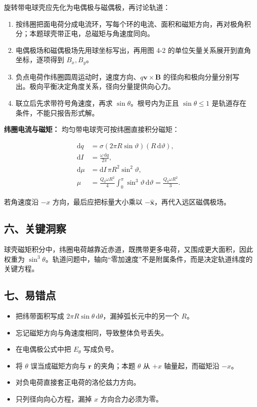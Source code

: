 \documentclass[12pt,a4paper,UTF8]{ctexart}
\newcommand{\tightlist}{\setlength{\itemsep}{0pt}\setlength{\parskip}{0pt}}
\begin{document}
旋转带电球壳应先化为电偶极与磁偶极，再讨论轨道：

\begin{enumerate}
\def\labelenumi{\arabic{enumi}.}
\tightlist
\item
  按纬圈把面电荷分成电流环，写每个环的电流、面积和磁矩方向，再对极角积分；本题球壳带正电，总磁矩与角速度同向。
\item
  电偶极场和磁偶极场先用球坐标写出，再用图 4-2
  的单位矢量关系展开到直角坐标，逐项得到 \(B_x,B_y\)。
\item
  负点电荷作纬圈圆周运动时，速度方向、\(q\boldsymbol v\times\boldsymbol B\)
  的径向和极向分量分别写出。极向平衡决定角度关系，径向分量提供向心力。
\item
  联立后先求带符号角速度，再求 \(\sin\theta\)。根号内为正且
  \(\sin\theta\le1\) 是轨道存在条件，不能只报告形式解。
\end{enumerate}

\textbf{纬圈电流与磁矩：} 均匀带电球壳可按纬圈直接积分磁矩：

\[\begin{aligned}
\mathrm dq&=\sigma(2\pi R\sin\vartheta)
(R\,\mathrm d\vartheta),\\
\mathrm dI&=\frac{\omega\,\mathrm dq}{2\pi},\\
\mathrm d\mu&=\mathrm dI\,\pi R^2\sin^2\vartheta,\\
\mu&=\frac{Q_0\omega R^2}{4}
\int_0^\pi\sin^3\vartheta\,\mathrm d\vartheta
=\frac{Q_0\omega R^2}{3}.
\end{aligned}\]

若角速度沿 \(-x\) 方向，最后应把标量大小乘以
\(-\hat{\boldsymbol x}\)，再代入远区磁偶极场。

\subsection{六、关键洞察}\label{ux516dux5173ux952eux6d1eux5bdf-3}

球壳磁矩积分中，纬圈电荷越靠近赤道，既携带更多电荷，又围成更大面积，因此权重为
\(\sin^3\theta\)。轨道问题中，轴向``零加速度''不是附属条件，而是决定轨道纬度的关键方程。

\subsection{七、易错点}\label{ux4e03ux6613ux9519ux70b9-3}

\begin{itemize}
\tightlist
\item
  把纬带面积写成
  \(2\pi R\sin\theta\,\mathrm d\theta\)，漏掉弧长元中的另一个 \(R\)。
\item
  忘记磁矩方向与角速度相同，导致整体负号丢失。
\item
  在电偶极公式中把 \(E_\theta\) 写成负号。
\item
  将 \(\theta\) 误当成磁矩方向与 \(\boldsymbol r\) 的夹角；本题
  \(\theta\) 从 \(+x\) 轴量起，而磁矩沿 \(-x\)。
\item
  对负电荷直接套正电荷的洛伦兹力方向。
\item
  只列径向向心方程，漏掉 \(x\) 方向合力必须为零。
\end{itemize}
\end{document}
